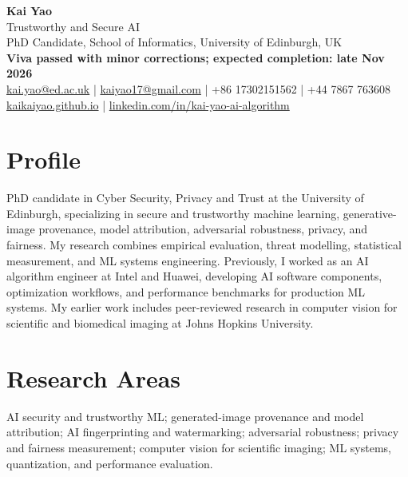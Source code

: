 \documentclass[10pt,a4paper]{article}
\makeatletter
\newcommand{\CandidateName}{Kai Yao}
\newcommand{\PrimaryEmail}{kai.yao@ed.ac.uk}
\newcommand{\SecondaryEmail}{kaiyao17@gmail.com}
\newcommand{\ChinaPhone}{+86 17302151562}
\newcommand{\UKPhone}{+44 7867 763608}
\newcommand{\PersonalPageURL}{https://kaikaiyao.github.io}
\newcommand{\PersonalPageText}{kaikaiyao.github.io}
\newcommand{\LinkedInURL}{https://www.linkedin.com/in/kai-yao-ai-algorithm/}
\newcommand{\LinkedInText}{linkedin.com/in/kai-yao-ai-algorithm}
\newcommand{\ExpectedGraduation}{Nov 2026}
\makeatother
\begin{document}
\fontsize{9.25}{10.35}\selectfont
\vspace*{-0.62cm}

\begin{center}
    {\huge \bfseries \CandidateName}\\[5pt]
    {\normalsize Trustworthy and Secure AI}\\[1pt]
    PhD Candidate, School of Informatics, University of Edinburgh, UK\\[1pt]
    \textbf{Viva passed with minor corrections; expected completion: late \ExpectedGraduation}\\[2pt]
    \small
    \href{mailto:\PrimaryEmail}{\PrimaryEmail} \;|\;
    \href{mailto:\SecondaryEmail}{\SecondaryEmail} \;|\;
    \ChinaPhone{} \;|\; \UKPhone{}\\[-1pt]
    \href{\PersonalPageURL}{\PersonalPageText} \;|\;
    \href{\LinkedInURL}{\LinkedInText}
\end{center}

\vspace{-0.55em}

\section*{Profile}
PhD candidate in Cyber Security, Privacy and Trust at the University of Edinburgh, specializing in secure and trustworthy machine learning, generative-image provenance, model attribution, adversarial robustness, privacy, and fairness. My research combines empirical evaluation, threat modelling, statistical measurement, and ML systems engineering. Previously, I worked as an AI algorithm engineer at Intel and Huawei, developing AI software components, optimization workflows, and performance benchmarks for production ML systems. My earlier work includes peer-reviewed research in computer vision for scientific and biomedical imaging at Johns Hopkins University.

\section*{Research Areas}
AI security and trustworthy ML; generated-image provenance and model attribution; AI fingerprinting and watermarking; adversarial robustness; privacy and fairness measurement; computer vision for scientific imaging; ML systems, quantization, and performance evaluation.
\end{document}

